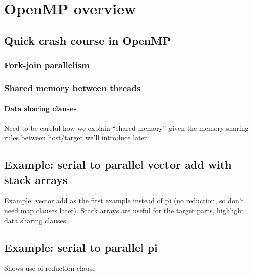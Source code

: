 
\chapter{OpenMP overview}
\section{Quick crash course in OpenMP}
\subsection{Fork-join parallelism}
\subsection{Shared memory between threads}
\subsubsection{Data sharing clauses}
Need to be careful how we explain “shared memory” given the memory sharing rules between host/target we’ll introduce later.

\section{Example: serial to parallel vector add with stack arrays}
Example: vector add as the first example instead of pi (no reduction, so don’t need map clauses later).
Stack arrays are useful for the target parts, highlight data sharing clauses

\section{Example: serial to parallel pi}
Shows use of reduction clause

